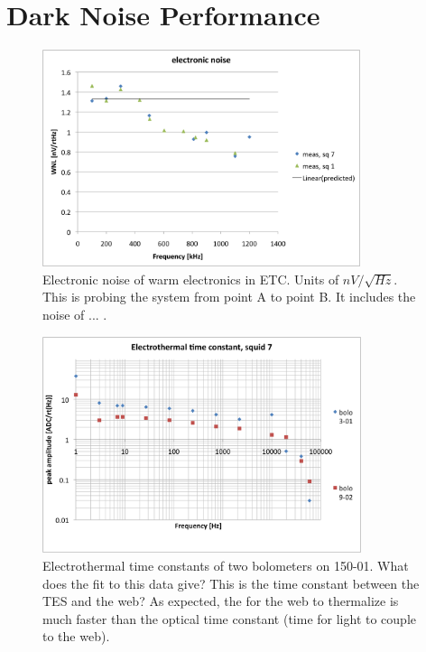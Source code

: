 \section{Dark Noise Performance}
\label{sec:dark_nosie}


\begin{figure}[ht!]
\begin{center}
\includegraphics[height=2.5in]{figures/electronic_noise_sq1_sq7}
\caption{Electronic noise of warm electronics in \ac{ETC}. Units of $nV/\sqrt{Hz}$. This is probing the system from point A to point B. It includes the noise of ... .
\label{fig:dark_electronic_noise} }
\end{center}
\end{figure}

\begin{figure}[ht!]
\begin{center}
\includegraphics[height=2.5in]{figures/Nb01_squid7_etau_morepts}
\caption{Electrothermal time constants of two bolometers on 150-01. What does the fit to this data give? This is the time constant between the TES and the web? As expected, the for the web to thermalize is much faster than the optical time constant (time for light to couple to the web). 
\label{fig:electrothermal_tau} }
\end{center}
\end{figure}

